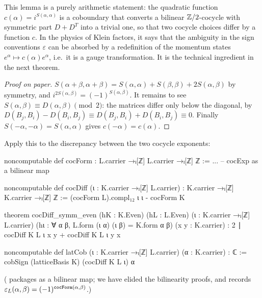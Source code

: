\begin{physics}
This lemma is a purely arithmetic statement: the quadratic function $c(\alpha)=i^{S(\alpha,\alpha)}$ is a coboundary that converts a bilinear ${\mathbb{Z}}/2$-cocycle with symmetric part $D+D^T$ into a trivial one, so that two cocycle choices differ by a function $c$. In the physics of Klein factors, it says that the ambiguity in the sign conventions $\varepsilon$ can be absorbed by a redefinition of the momentum states $e^\alpha\mapsto c(\alpha)e^\alpha$, i.e.\ it is a gauge transformation. It is the technical ingredient in the next theorem.
\end{physics}
\begin{proof}[Proof on paper]
$S(\alpha+\beta,\alpha+\beta)=S(\alpha,\alpha)+S(\beta,\beta)+2S(\alpha,\beta)$ by symmetry, and
$i^{2S(\alpha,\beta)}=(-1)^{S(\alpha,\beta)}$. It remains to see $S(\alpha,\beta)\equiv D(\alpha,
\beta)\pmod2$: the matrices differ only below the diagonal, by $D(B_j,B_i)-D(B_i,B_j)\equiv
D(B_j,B_i)+D(B_i,B_j)\equiv0$. Finally $S(-\alpha,-\alpha)=S(\alpha,\alpha)$ gives $c(-\alpha)=
c(\alpha)$.
\end{proof}

Apply this to the discrepancy between the two cocycle exponents:
\begin{leancode}
noncomputable def cocForm : L.carrier →ₗ[ℤ] L.carrier →ₗ[ℤ] ℤ := ...   -- cocExp as a bilinear map

noncomputable def cocDiff (ι : K.carrier →ₗ[ℤ] L.carrier) : K.carrier →ₗ[ℤ] K.carrier →ₗ[ℤ] ℤ :=
  (cocForm L).compl₁₂ ι ι - cocForm K

theorem cocDiff_symm_even (hK : K.Even) (hL : L.Even) (ι : K.carrier →ₗ[ℤ] L.carrier)
    (hι : ∀ α β, L.form (ι α) (ι β) = K.form α β) (x y : K.carrier) :
    2 ∣ cocDiff K L ι x y + cocDiff K L ι y x

noncomputable def latCob (ι : K.carrier →ₗ[ℤ] L.carrier) (α : K.carrier) : ℂ :=
  cobSign (latticeBasis K) (cocDiff K L ι) α
\end{leancode}
( packages  as a bilinear map; we have elided the
bilinearity proofs, and  records
$\varepsilon_L(\alpha,\beta)=(-1)^{\lean{cocForm}(\alpha,\beta)}$.)

